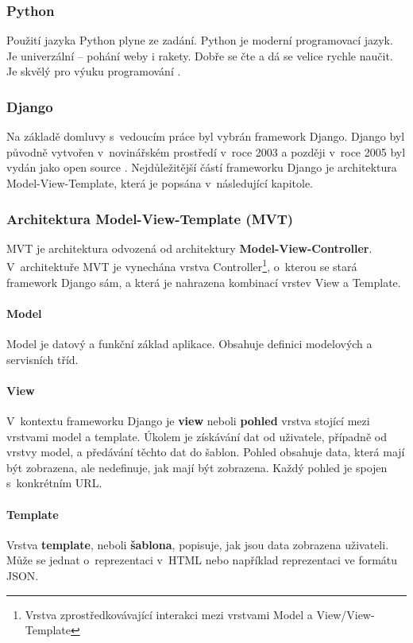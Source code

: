 \subsubsection{Python}
Použití jazyka Python plyne ze zadání. Python je moderní programovací jazyk. Je univerzální – pohání weby i rakety. Dobře se čte a dá se velice rychle naučit. Je skvělý pro výuku programování \cite{python-cz}.

\subsubsection{Django}
Na základě domluvy s~vedoucím práce byl vybrán framework Django. Django byl původně vytvořen v~novinářském prostředí v~roce 2003 a později v~roce 2005 byl vydán jako open source \cite{djangobook, django-cr}. Nejdůležitější částí frameworku Django je architektura Model-View-Template, která je popsána v~následující kapitole.

\subsubsection{Architektura Model-View-Template (MVT)}
MVT je architektura odvozená od architektury \textbf{Model-View-Controller}. V~architektuře MVT je vynechána vrstva Controller\footnote{Vrstva zprostředkovávající interakci mezi vrstvami Model a View/View-Template}, o~kterou se stará framework Django sám, a která je nahrazena kombinací vrstev View a Template.

\paragraph*{Model}
Model je datový a funkční základ aplikace. Obsahuje definici modelových a servisních tříd.
\paragraph*{View}
V~kontextu frameworku Django je \textbf{view} neboli \textbf{pohled} vrstva stojící mezi vrstvami model a template. Úkolem je získávání dat od uživatele, případně od vrstvy model, a předávání těchto dat do šablon. Pohled obsahuje data, která mají být zobrazena, ale nedefinuje, jak mají být zobrazena. Každý pohled je spojen s~konkrétním URL.
\paragraph*{Template}
Vrstva \textbf{template}, neboli \textbf{šablona}, popisuje, jak jsou data zobrazena uživateli. Může se jednat o~reprezentaci v~HTML nebo například reprezentaci ve formátu JSON.